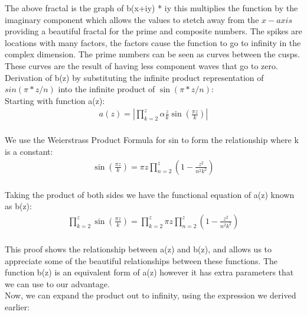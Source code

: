 \documentclass{article}
\begin{document}
The above fractal is the graph of b(x+iy) * iy this multiplies the function by the imaginary component which allows the values to stetch away from the $x-axis$ providing a beautiful fractal for the prime and composite numbers. The spikes are locations with many factors, the factors cause the function to go to infinity in the complex dimension. The prime numbers can be seen as curves between the cusps. These curves are the result of having less component waves that go to zero. \\

\newpage
Derivation of b(z) by substituting the infinite product representation of $sin(\pi*z/n)$ into the infinite product of $\sin(\pi*z/n)$: \\

Starting with function a(z): \\
\begin{align*}
	a(z) = |\prod_{k=2}^z \alpha\frac{z}{k}\sin\left(\frac{\pi z}{k}\right)| \\
\end{align*}

We use the Weierstrass Product Formula for sin to form the relationship where k is a constant: \\
\begin{align*}
	\sin\left(\frac{\pi z}{k}\right) = \pi z\prod_{n=2}^z \left(1-\frac{z^2}{n^2k^2}\right) \\
\end{align*}

Taking the product of both sides we have the functional equation of a(z) known as b(z): \\
\begin{align*}
	\prod_{k=2}^z\sin\left(\frac{\pi z}{k}\right) = \prod_{k=2}^z \pi z\prod_{n=2}^z \left(1-\frac{z^2}{n^2k^2}\right) \\
\end{align*}

This proof shows the relationship between a(z) and b(z), and allows us to appreciate some of the beautiful relationships between these functions. The function b(z) is an equivalent form of a(z) however it has extra parameters that we can use to our advantage. \\

Now, we can expand the product out to infinity, using the expression we derived earlier:
\end{document}
